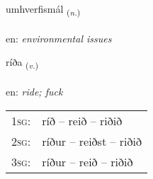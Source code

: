 \documentclass[frontgrid, backgrid]{flacards}\usepackage[]{graphicx}\usepackage[]{color}
\begin{document}
\renewcommand{\flhead}{\vskip5pt \fboxsep=0pt {\small\bfseries\footnotesize Nafnorð | Noun}}
\renewcommand{\fcfoot}{\vskip5pt \fboxsep=0pt \hspace{2pt}{\small\bfseries\footnotesize 2K}}

\renewcommand{\blhead}{\vskip5pt {\small\bfseries\footnotesize Nafnorð | Noun }}
\renewcommand{\bcfoot}{\vskip5pt \hspace{2pt}{\small\bfseries\footnotesize 2K}}


{umhverfismál \small{\textsubscript{(\textit{n.})}} \\[1ex] %
\textphonetic{[ʏmkʰvɛrvɪsmaul]} \\
en: \emph{environmental issues} \\  [2ex]
\renewcommand*{\arraystretch}{0.8}
}

\renewcommand{\flhead}{\vskip5pt \fboxsep=0pt {\small\bfseries\footnotesize Sagnorð | Verb}}
\renewcommand{\fcfoot}{\vskip5pt \fboxsep=0pt \hspace{2pt}{\small\bfseries\footnotesize 2K}}

\renewcommand{\blhead}{\vskip5pt {\small\bfseries\footnotesize Sagnorð | Verb }}
\renewcommand{\bcfoot}{\vskip5pt \hspace{2pt}{\small\bfseries\footnotesize 2K}}


{ríða \small{\textsubscript{(\textit{v.})}} \\[1ex] %
\textphonetic{[riːða]} \\
en: \emph{ride; fuck} \\  [2ex]
\renewcommand*{\arraystretch}{0.8}
\begin{tabular}{p{1cm}l}
\textsc{1sg}: & ríð -- reið -- riðið \\ 
\textsc{2sg}: & ríður -- reiðst -- riðið \\ 
\textsc{3sg}: & ríður -- reið -- riðið \\ 
\end{tabular}
}
\end{document}
